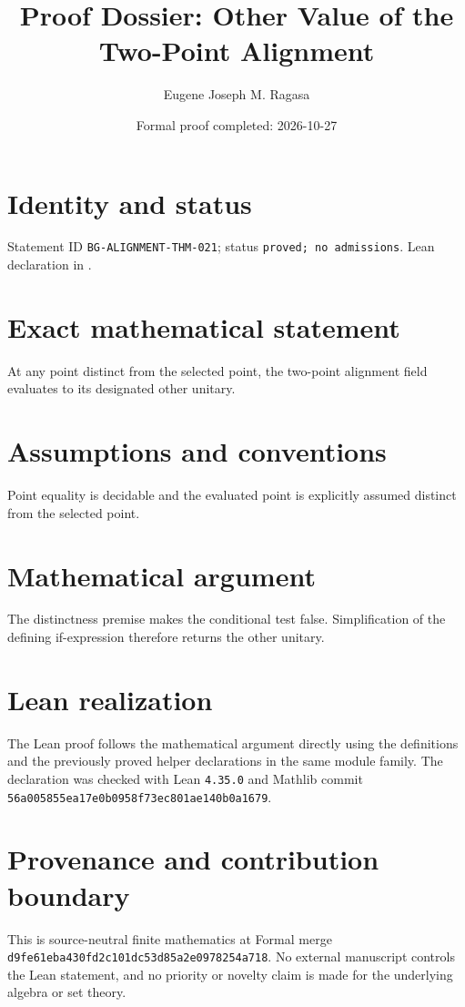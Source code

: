 \documentclass[11pt]{article}
\title{Proof Dossier: Other Value of the Two-Point Alignment}
\author{Eugene Joseph M. Ragasa}
\date{Formal proof completed: 2026-10-27}
\begin{document}
\raggedright
\maketitle

\section{Identity and status}
Statement ID \texttt{BG-ALIGNMENT-THM-021}; status \texttt{proved; no admissions}.  Lean declaration
 in
.

\section{Exact mathematical statement}
At any point distinct from the selected point, the two-point alignment field evaluates to its designated other unitary.

\section{Assumptions and conventions}
Point equality is decidable and the evaluated point is explicitly assumed distinct from the selected point.

\section{Mathematical argument}
The distinctness premise makes the conditional test false.  Simplification of the defining if-expression therefore returns the other unitary.

\section{Lean realization}
The Lean proof follows the mathematical argument directly using the definitions and the
previously proved helper declarations in the same module family.  The declaration was checked
with Lean \texttt{4.35.0} and Mathlib commit \texttt{56a005855ea17e0b0958f73ec801ae140b0a1679}.

\section{Provenance and contribution boundary}
This is source-neutral finite mathematics at Formal merge
\texttt{d9fe61eba430fd2c101dc53d85a2e0978254a718}.  No external manuscript controls the Lean statement, and no priority or
novelty claim is made for the underlying algebra or set theory.
\end{document}

